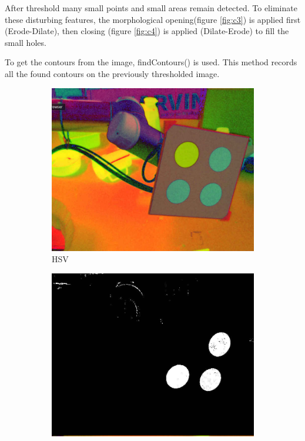 After threshold many small points and small areas remain detected. To eliminate these disturbing features, the morphological 
opening(figure \ref{fig:c3})  is applied first (Erode-Dilate), then closing (figure \ref{fig:c4}) is applied (Dilate-Erode) to fill the small holes. 

To get the contours from the image, findContours() is used. This method records all the found contours on the previously thresholded
image.

\begin{figure}[ht!]
	\begin{subfigure}{.49\textwidth}
		\centering
		\includegraphics[width=\textwidth]{figures/color1}
	\caption{HSV}
	\label{fig:c1}
	\end{subfigure}
	\begin{subfigure}{0.49\textwidth}
		\centering
		\includegraphics[width=\textwidth]{figures/color2}

\end{subfigure}
\end{figure}
